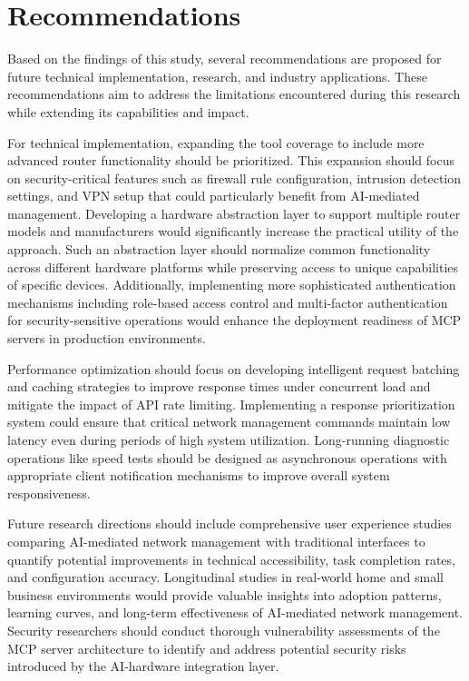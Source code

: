 \chapter{Recommendations}
\label{chap:recommendations}

Based on the findings of this study, several recommendations are proposed for future technical implementation, research, and industry applications. These recommendations aim to address the limitations encountered during this research while extending its capabilities and impact.

For technical implementation, expanding the tool coverage to include more advanced router functionality should be prioritized. This expansion should focus on security-critical features such as firewall rule configuration, intrusion detection settings, and VPN setup that could particularly benefit from AI-mediated management. Developing a hardware abstraction layer to support multiple router models and manufacturers would significantly increase the practical utility of the approach. Such an abstraction layer should normalize common functionality across different hardware platforms while preserving access to unique capabilities of specific devices. Additionally, implementing more sophisticated authentication mechanisms including role-based access control and multi-factor authentication for security-sensitive operations would enhance the deployment readiness of MCP servers in production environments.

Performance optimization should focus on developing intelligent request batching and caching strategies to improve response times under concurrent load and mitigate the impact of API rate limiting. Implementing a response prioritization system could ensure that critical network management commands maintain low latency even during periods of high system utilization. Long-running diagnostic operations like speed tests should be designed as asynchronous operations with appropriate client notification mechanisms to improve overall system responsiveness.

Future research directions should include comprehensive user experience studies comparing AI-mediated network management with traditional interfaces to quantify potential improvements in technical accessibility, task completion rates, and configuration accuracy. Longitudinal studies in real-world home and small business environments would provide valuable insights into adoption patterns, learning curves, and long-term effectiveness of AI-mediated network management. Security researchers should conduct thorough vulnerability assessments of the MCP server architecture to identify and address potential security risks introduced by the AI-hardware integration layer.


